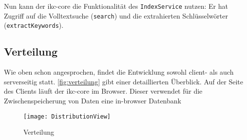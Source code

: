 Nun kann der \gls{ikc-core} die Funktionalität des \texttt{IndexService} nutzen: Er hat Zugriff auf die Volltextsuche (\texttt{search}) und die extrahierten Schlüsselwörter (\texttt{extractKeywords}). 

\subsection{Verteilung}

Wie oben schon angesprochen, findet die Entwicklung sowohl client- als auch serverseitig statt. \autoref{fig:verteilung} gibt einer detaillierten Üb\-er\-blick. Auf der Seite des Clients läuft der \gls{ikc-core} im Browser. Dieser verwendet für die Zwischenspeicherung von Daten eine \gls{in-browser Datenbank}

    
        \begin{figure}[H]
    \centering
    \texttt{[image: DistributionView]}
    \caption{Verteilung}
    \label{fig:verteilung}
    \end{figure}
